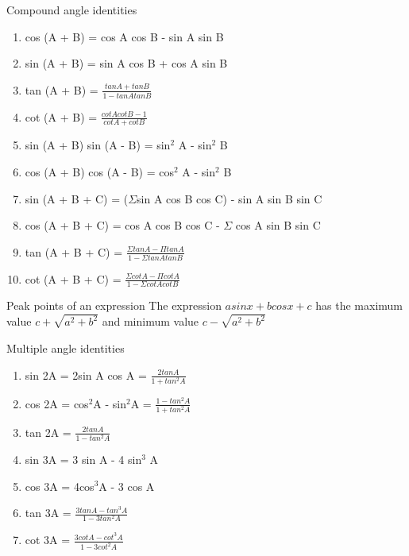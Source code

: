 \documentclass[titlepage, 12pt]{book}
\begin{document}
\begin{theorem}{Compound angle identities}{}
    \begin{enumerate}
        \item cos (A + B) = cos A cos B - sin A sin B
        \item sin (A + B) = sin A cos B + cos A sin B
        \item tan (A + B) = $\frac{tan A + tan B}{1 - tan A tan B}$
        \item cot (A + B) = $\frac{cot A cot B - 1}{cot A + cot B}$
        \item sin (A + B) sin (A - B) = sin$^2$ A - sin$^2$ B
        \item cos (A + B) cos (A - B) = cos$^2$ A - sin$^2$ B
        \item sin (A + B + C) = ($\Sigma$sin A cos B cos C) - sin A sin B sin C
        \item cos (A + B + C) = cos A cos B cos C - $\Sigma$ cos A sin B sin C
        \item tan (A + B + C) = $\frac{\Sigma tan A - \Pi tan A}{1 - \Sigma tan A tan B}$
        \item cot (A + B + C) = $\frac{\Sigma cot A - \Pi cot A}{1 - \Sigma cot A cot B}$
    \end{enumerate}
\end{theorem}

\begin{theorem}{Peak points of an expression}{}
    The expression $asinx + bcosx + c$ has the maximum value $c +
    \sqrt{a^2+b^2}$ and minimum value $c - \sqrt{a^2+b^2}$
\end{theorem}

\begin{theorem}{Multiple angle identities}{}
    \begin{enumerate}
        \item sin 2A = 2sin A cos A = $\frac{2tan A}{1 + tan^2A}$
        \item cos 2A = cos$^2$A - sin$^2$A = $\frac{1 - tan^2 A}{1 + tan^2A}$
        \item tan 2A = $\frac{2tanA}{1 - tan^2A}$
        \item sin 3A = 3 sin A - 4 sin$^3$ A
        \item cos 3A = 4cos$^3$A - 3 cos A
        \item tan 3A = $\frac{3tanA - tan^3A}{1 - 3 tan^2A}$
        \item cot 3A = $\frac{3cot A - cot^3 A}{1 - 3 cot^2A}$
    \end{enumerate}
\end{theorem}
\end{document}

